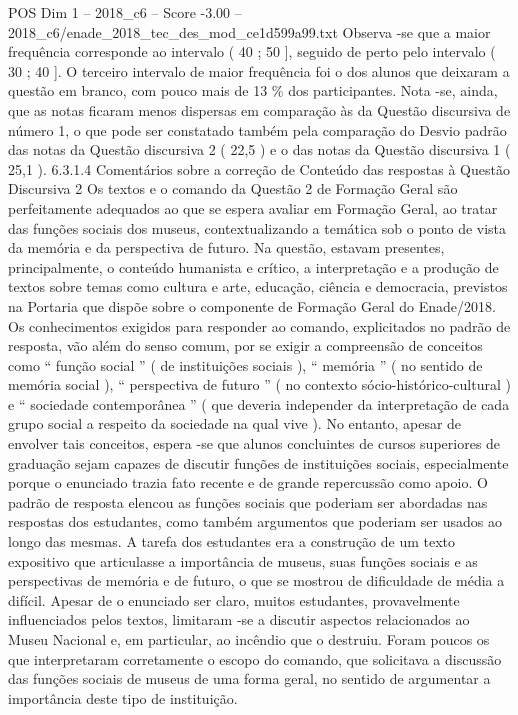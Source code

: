 \begin{textsample}{POS Dim 1 – 2018\_c6 – Score -3.00 – 2018\_c6/enade\_2018\_tec\_des\_mod\_ce1d599a99.txt}
Observa -se que a maior frequência corresponde ao intervalo ( 40 ; 50 ], seguido de perto pelo intervalo ( 30 ; 40 ].
O terceiro intervalo de maior frequência foi o dos alunos que deixaram a questão em branco, com pouco mais de 13 \% dos participantes.
Nota -se, ainda, que as notas ficaram menos dispersas em comparação às da Questão discursiva de número 1, o que pode ser constatado também pela comparação do Desvio padrão das notas da Questão discursiva 2 ( 22,5 ) e o das notas da Questão discursiva 1 ( 25,1 ). 6.3.1.4 Comentários sobre a correção de Conteúdo das respostas à Questão Discursiva 2 Os textos e o comando da Questão 2 de Formação Geral são perfeitamente adequados ao que se espera avaliar em Formação Geral, ao tratar das funções sociais dos museus, contextualizando a temática sob o ponto de vista da memória e da perspectiva de futuro.
Na questão, estavam presentes, principalmente, o conteúdo humanista e crítico, a interpretação e a produção de textos sobre temas como cultura e arte, educação, ciência e democracia, previstos na Portaria que dispõe sobre o componente de Formação Geral do Enade/2018.
Os conhecimentos exigidos para responder ao comando, explicitados no padrão de resposta, vão além do senso comum, por se exigir a compreensão de conceitos como “ função social ” ( de instituições sociais ), “ memória ” ( no sentido de memória social ), “ perspectiva de futuro ” ( no contexto sócio-histórico-cultural ) e “ sociedade contemporânea ” ( que deveria independer da interpretação de cada grupo social a respeito da sociedade na qual vive ).
No entanto, apesar de envolver tais conceitos, espera -se que alunos concluintes de cursos superiores de graduação sejam capazes de discutir funções de instituições sociais, especialmente porque o enunciado trazia fato recente e de grande repercussão como apoio.
O padrão de resposta elencou as funções sociais que poderiam ser abordadas nas respostas dos estudantes, como também argumentos que poderiam ser usados ao longo das mesmas.
A tarefa dos estudantes era a construção de um texto expositivo que articulasse a importância de museus, suas funções sociais e as perspectivas de memória e de futuro, o que se mostrou de dificuldade de média a difícil.
Apesar de o enunciado ser claro, muitos estudantes, provavelmente influenciados pelos textos, limitaram -se a discutir aspectos relacionados ao Museu Nacional e, em particular, ao incêndio que o destruiu.
Foram poucos os que interpretaram corretamente o escopo do comando, que solicitava a discussão das funções sociais de museus de uma forma geral, no sentido de argumentar a importância deste tipo de instituição.

\end{textsample}

